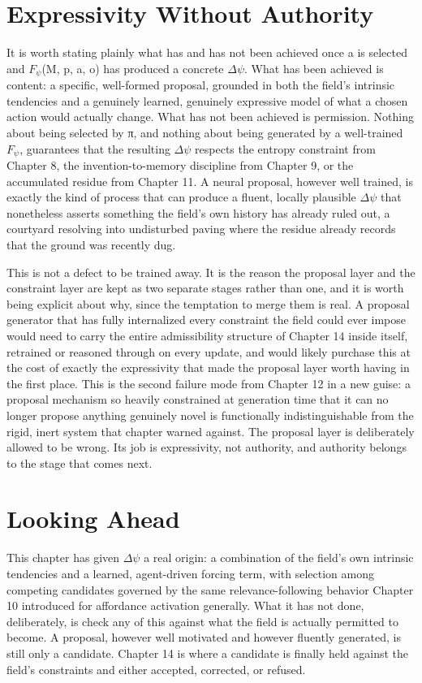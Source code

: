 \section{Expressivity Without Authority}

It is worth stating plainly what has and has not been achieved once a is selected and \(F_\psi\)(M, p, a, o) has produced a concrete \(\Delta\psi\). What has been achieved is content: a specific, well-formed proposal, grounded in both the field's intrinsic tendencies and a genuinely learned, genuinely expressive model of what a chosen action would actually change. What has not been achieved is permission. Nothing about being selected by π, and nothing about being generated by a well-trained \(F_\psi\), guarantees that the resulting \(\Delta\psi\) respects the entropy constraint from Chapter 8, the invention-to-memory discipline from Chapter 9, or the accumulated residue from Chapter 11. A neural proposal, however well trained, is exactly the kind of process that can produce a fluent, locally plausible \(\Delta\psi\) that nonetheless asserts something the field's own history has already ruled out, a courtyard resolving into undisturbed paving where the residue already records that the ground was recently dug.

This is not a defect to be trained away. It is the reason the proposal layer and the constraint layer are kept as two separate stages rather than one, and it is worth being explicit about why, since the temptation to merge them is real. A proposal generator that has fully internalized every constraint the field could ever impose would need to carry the entire admissibility structure of Chapter 14 inside itself, retrained or reasoned through on every update, and would likely purchase this at the cost of exactly the expressivity that made the proposal layer worth having in the first place. This is the second failure mode from Chapter 12 in a new guise: a proposal mechanism so heavily constrained at generation time that it can no longer propose anything genuinely novel is functionally indistinguishable from the rigid, inert system that chapter warned against. The proposal layer is deliberately allowed to be wrong. Its job is expressivity, not authority, and authority belongs to the stage that comes next.

\section{Looking Ahead}

This chapter has given \(\Delta\psi\) a real origin: a combination of the field's own intrinsic tendencies and a learned, agent-driven forcing term, with selection among competing candidates governed by the same relevance-following behavior Chapter 10 introduced for affordance activation generally. What it has not done, deliberately, is check any of this against what the field is actually permitted to become. A proposal, however well motivated and however fluently generated, is still only a candidate. Chapter 14 is where a candidate is finally held against the field's constraints and either accepted, corrected, or refused.
